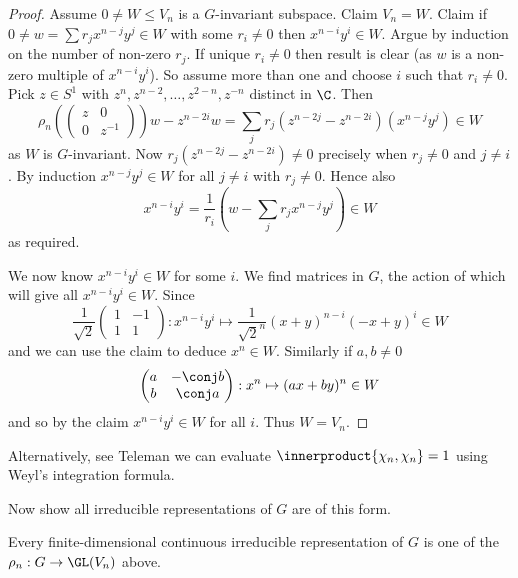 \documentclass[a4paper]{article}
\newcommand*{\ip}{\innerproduct} %
\theoremstyle{definition}
\begin{document}
\begin{proof}
  Assume \(0 \neq W \leq V_n\) is a \(G\)-invariant subspace. Claim \(V_n = W\). Claim if \(0 \neq w = \sum r_j x^{n - j} y^j \in W\) with some \(r_i \neq 0\) then \(x^{n - i}y^i \in W\). Argue by induction on the number of non-zero \(r_j\). If unique \(r_i \neq 0\) then result is clear (as \(w\) is a non-zero multiple of \(x^{n - i} y^i\)). So assume more than one and choose \(i\) such that \(r_i \neq 0\). Pick \(z \in S^1\) with \(z^n, z^{n - 2}, \dots, z^{2 - n}, z^{-n}\) distinct in \(\C\). Then
  \[
    \rho_n (
    \begin{pmatrix}
      z & 0 \\
      0 & z^{-1}
    \end{pmatrix}
    )w - z^{n - 2i} w
    = \sum_j r_j (z^{n - 2j} - z^{n - 2i}) (x^{n - j} y^j) \in W
  \]
  as \(W\) is \(G\)-invariant. Now \(r_j (z^{n - 2j} - z^{n - 2i}) \neq 0\) precisely when \(r_j \neq 0\) and \(j \neq i\). By induction \(x^{n - j} y^j \in W\) for all \(j \neq i\) with \(r_j \neq 0\). Hence also
  \[
    x^{n - i} y^i = \frac{1}{r_i} (w - \sum_j r_j x^{n - j} y^j) \in W
  \]
  as required.

  We now know \(x^{n - i} y^i \in W\) for some \(i\). We find matrices in \(G\), the action of which will give all \(x^{n - i} y^i \in W\). Since
  \[
    \frac{1}{\sqrt 2}
    \begin{pmatrix}
      1 & -1 \\
      1 & 1
    \end{pmatrix}
    : x^{n - i} y^i \mapsto \frac{1}{\sqrt 2^n} (x + y)^{n - i} (-x + y)^i \in W
  \]
  and we can use the claim to deduce \(x^n \in W\). Similarly if \(a, b \neq 0\)
  \[
    \begin{pmatrix}
      a & -\conj b \\
      b & \conj a
    \end{pmatrix}
    : x^n \mapsto (ax + by)^n \in W
  \]
  and so by the claim \(x^{n - i} y^i \in W\) for all \(i\). Thus \(W = V_n\).
\end{proof}

\begin{remark}
  Alternatively, see Teleman  we can evaluate \(\ip{\chi_n, \chi_n} = 1\) using Weyl's integration formula.
\end{remark}

Now show all irreducible representations of \(G\) are of this form.

\begin{theorem}
  Every finite-dimensional continuous irreducible representation of \(G\) is one of the \(\rho_n: G \to \GL(V_n)\) above.
\end{theorem}
\end{document}
